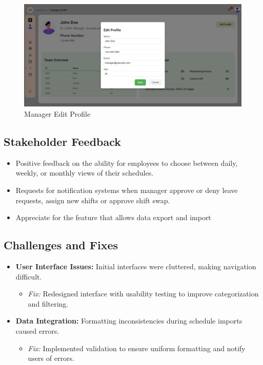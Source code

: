\documentclass[a4paper,12pt, oneside]{report}
\begin{document}
\begin{itemize}
    \begin{figure}[H]
    \centering
    \includegraphics[width=0.8\columnwidth]{ManagerPages/ManagerProfile2.png}
    \caption{Manager Edit Profile}
    \label{fig:manager-profile-edit}
    \end{figure}
    
\end{itemize}

\subsection{Stakeholder Feedback}
\begin{itemize}
    \item Positive feedback on the ability for employees to choose between daily, weekly, or monthly views of their schedules.
    \item Requests for notification systems when manager approve or deny leave requests, assign new shifts or approve shift swap.
    \item Appreciate for the feature that allows data export and import
\end{itemize}

\subsection{Challenges and Fixes}
    \begin{itemize} 
    \item \textbf{User Interface Issues:} Initial interfaces were cluttered, making navigation difficult. 
        \begin{itemize} 
        \item \textit{Fix:} Redesigned interface with usability testing to improve categorization and filtering. 
        \end{itemize} 
    \item \textbf{Data Integration:} Formatting inconsistencies during schedule imports caused errors. 
        \begin{itemize} 
        \item \textit{Fix:} Implemented validation to ensure uniform formatting and notify users of errors. 
        \end{itemize}
     \end{itemize}
\end{document}
